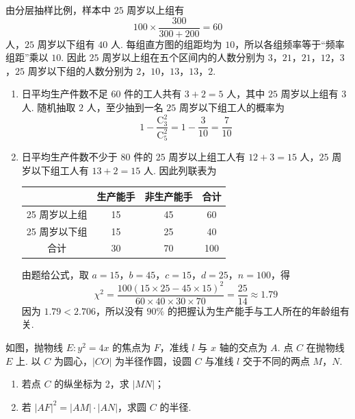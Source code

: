 \begin{solution}
由分层抽样比例，样本中 \(25\) 周岁以上组有
\[
100\times\frac{300}{300+200}=60
\]
人，\(25\) 周岁以下组有 \(40\) 人. 每组直方图的组距均为 \(10\)，所以各组频率等于“频率组距”乘以 \(10\). 因此 \(25\) 周岁以上组在五个区间内的人数分别为 \(3\)，\(21\)，\(21\)，\(12\)，\(3\)，\(25\) 周岁以下组的人数分别为 \(2\)，\(10\)，\(13\)，\(13\)，\(2\).

\begin{enumerate}
\item 日平均生产件数不足 \(60\) 件的工人共有 \(3+2=5\) 人，其中 \(25\) 周岁以上组有 \(3\) 人. 随机抽取 \(2\) 人，至少抽到一名 \(25\) 周岁以下组工人的概率为
\[
1-\frac{\mathrm C_3^2}{\mathrm C_5^2}=1-\frac3{10}=\frac7{10}
\]

\item 日平均生产件数不少于 \(80\) 件的 \(25\) 周岁以上组工人有 \(12+3=15\) 人，\(25\) 周岁以下组工人有 \(13+2=15\) 人. 因此列联表为

\begin{center}
\begin{tabular}{c|ccc}
 & 生产能手 & 非生产能手 & 合计 \\
\hline
25 周岁以上组 & 15 & 45 & 60 \\
25 周岁以下组 & 15 & 25 & 40 \\
合计 & 30 & 70 & 100
\end{tabular}
\end{center}

由题给公式，取 \(a=15\)，\(b=45\)，\(c=15\)，\(d=25\)，\(n=100\)，得
\[
\chi^2=\frac{100(15\times25-45\times15)^2}{60\times40\times30\times70}=\frac{25}{14}\approx1.79
\]
因为 \(1.79<2.706\)，所以没有 \(90\%\) 的把握认为生产能手与工人所在的年龄组有关.
\end{enumerate}
\end{solution}

\begin{problem}
如图，抛物线 \(E: y^{2} = 4x\) 的焦点为 \(F\)，准线 \(l\) 与 \(x\) 轴的交点为 \(A\). 点 \(C\) 在抛物线 \(E\) 上. 以 \(C\) 为圆心，\(|CO|\) 为半径作圆，设圆 \(C\) 与准线 \(l\) 交于不同的两点 \(M\)，\(N\).
\begin{enumerate}
\item 若点 \(C\) 的纵坐标为 2，求 \( \left|MN\right| \)；
\item 若 \( \left|AF\right|^{2}=\left|AM\right|\cdot\left|AN\right| \)，求圆 \(C\) 的半径.
\end{enumerate}

\end{problem}

